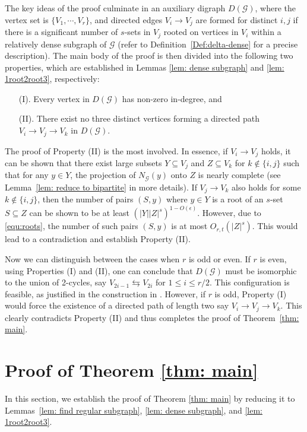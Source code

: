 \documentclass[11pt]{article}
\begin{document}
The key ideas of the proof culminate in an auxiliary digraph $D(\mathcal G)$, where the vertex set is $\{V_1, \cdots , V_r\}$, and directed edges $V_i \rightarrow V_j$ are formed for distinct $i,j$ if there is a significant number of $s$-sets in $V_j$ rooted on vertices in $V_i$ within a relatively dense subgraph of $\mathcal G$ (refer to Definition~\ref{Def:delta-dense} for a precise description).
The main body of the proof is then divided into the following two properties, which are established in Lemmas \ref{lem: dense subgraph} and \ref{lem: 1root2root3}, respectively:
\begin{itemize}
\item[(I).] Every vertex in $D(\mathcal G)$ has non-zero in-degree, and
\item[(II).] There exist no three distinct vertices forming a directed path $V_i \rightarrow V_j\rightarrow V_k$ in $D(\mathcal G)$.
\end{itemize}
The proof of Property (II) is the most involved.
In essence, if $V_i \rightarrow V_j$ holds, it can be shown that there exist large subsets $Y\subseteq V_j$ and $Z\subseteq V_k$ for $k\notin \{i,j\}$ such that for any $y\in Y$,
the projection of $N_{\mathcal{G}}(y)$ onto $Z$ is nearly complete (see Lemma~\ref{lem: reduce to bipartite} in more details).
If $V_j\rightarrow V_k$ also holds for some $k\notin \{i,j\}$, then the number of pairs $(S,y)$ where $y\in Y$ is a root of an $s$-set $S\subseteq Z$ can be shown to be at least $(|Y||Z|^s)^{1-O(\epsilon)}$. However, due to \eqref{equ:roots}, the number of such pairs $(S,y)$ is at most $O_{r,t}(|Z|^s)$. This would lead to a contradiction and establish Property (II).

Now we can distinguish between the cases when $r$ is odd or even.
If $r$ is even, using Properties (I) and (II), one can conclude that $D(\mathcal G)$ must be isomorphic to the union of 2-cycles, say $ V_{2i-1} \leftrightarrows V_{2i}$ for $1\le i\le r/2$. This configuration is feasible, as justified in the construction in \cite{BGJS23}.
However, if $r$ is odd, Property (I) would force the existence of a directed path of length two say $V_i \rightarrow V_j\rightarrow V_k$.
This clearly contradicts Property (II) and thus completes the proof of Theorem~\ref{thm: main}.


\section{Proof of Theorem \ref{thm: main}}
In this section, we establish the proof of Theorem \ref{thm: main} by reducing it to Lemmas~\ref{lem: find regular subgraph}, \ref{lem: dense subgraph}, and \ref{lem: 1root2root3}.
\end{document}
